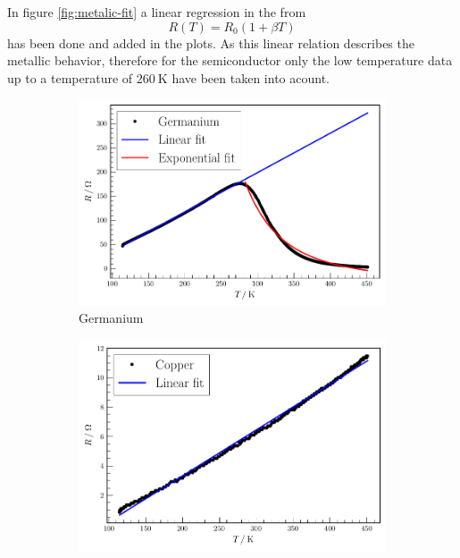 In figure \ref{fig:metalic-fit} a linear regression in the from
\begin{equation}
    R(T) = R_0 (1+\beta T)
\end{equation}
has been done and added in the plots. 
As this linear relation describes the metallic behavior, therefore for the semiconductor only the low temperature data up to a temperature of $\SI{260}{\kelvin}$ have been taken into acount.

\begin{figure}
    \centering
\begin{subfigure}{.3\textwidth}
    \centering
    \includegraphics[width=\textwidth]{plots/R1.pdf}
    \caption{Germanium}
    \label{fig:Ge}
\end{subfigure}
\begin{subfigure}{.3\textwidth}
    \centering
    \includegraphics[width=\textwidth]{plots/R2.pdf}

\end{subfigure}
\end{figure}
